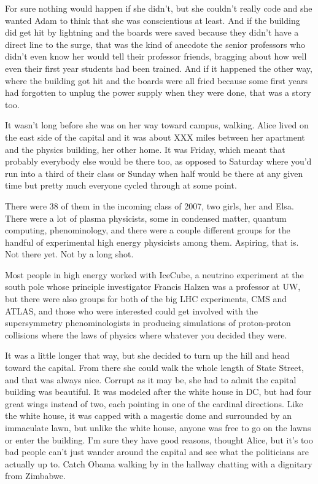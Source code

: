 For sure nothing would happen if she didn't, but she couldn't really code and she wanted Adam to think that she was conscientious at least. And if the building did get hit by lightning and the boards were saved because they didn't have a direct line to the surge, that was the kind of anecdote the senior professors who didn't even know her would tell their professor friends, bragging about how well even their first year students had been trained. And if it happened the other way, where the building got hit and the boards were all fried because some first years had forgotten to unplug the power supply when they were done, that was a story too.

\mypause

It wasn't long before she was on her way toward campus, walking. Alice lived on the east side of the capital and it was about XXX miles between her apartment and the physics building, her other home. It was Friday, which meant that probably everybody else would be there too, as opposed to Saturday where you'd run into a third of their class or Sunday when half would be there at any given time but pretty much everyone cycled through at some point. 

There were 38 of them in the incoming class of 2007, two girls, her and Elsa. There were a lot of plasma physicists, some in condensed matter, quantum computing, phenominology, and there were a couple different groups for the handful of experimental high energy physicists among them. Aspiring, that is. Not there yet. Not by a long shot. 

Most people in high energy worked with IceCube, a neutrino experiment at the south pole whose principle investigator Francis Halzen was a professor at UW, but there were also groups for both of the big LHC experiments, CMS and ATLAS, and those who were interested could get involved with the supersymmetry phenominologists in producing simulations of proton-proton collisions where the laws of physics where whatever you decided they were.

\mypause

It was a little longer that way, but she decided to turn up the hill and head toward the capital. From there she could walk the whole length of State Street, and that was always nice. Corrupt as it may be, she had to admit the capital building was beautiful. It was modeled after the white house in DC, but had four great wings instead of two, each pointing in one of the cardinal directions. Like the white house, it was capped with a magestic dome and surrounded by an immaculate lawn, but unlike the white house, anyone was free to go on the lawns or enter the building. I'm sure they have good reasons, thought Alice, but it's too bad people can't just wander around the capital and see what the politicians are actually up to. Catch Obama walking by in the hallway chatting with a dignitary from Zimbabwe. 

